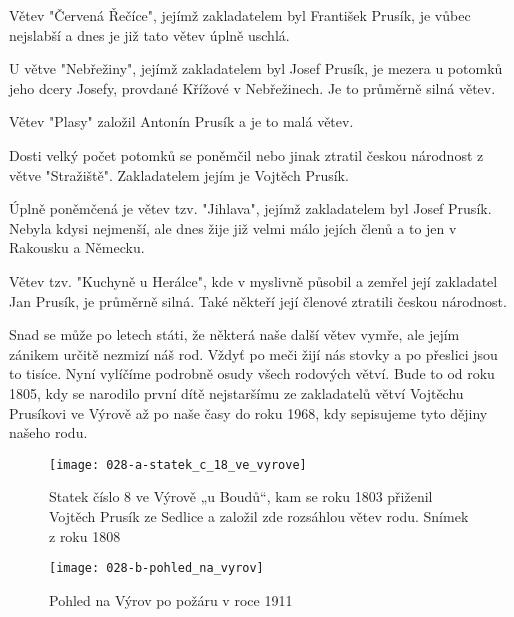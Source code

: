 \documentclass[../dejiny-rodu-prusiku.tex]{subfiles}
\begin{document}
Větev "Červená Řečíce", jejímž zakladatelem byl František Prusík, je vůbec nejslabší a dnes je již tato větev úplně uschlá.

U větve "Nebřežiny", jejímž zakladatelem byl Josef Prusík, je mezera u potomků jeho dcery Josefy, provdané Křížové v Nebřežinech. Je to průměrně silná větev.

Větev "Plasy" založil Antonín Prusík a je to malá větev.

Dosti velký počet potomků se poněmčil nebo jinak ztratil českou národnost z větve "Stražiště". Zakladatelem jejím je Vojtěch Prusík.

Úplně poněmčená je větev tzv. "Jihlava", jejímž zakladatelem byl Josef Prusík. Nebyla kdysi nejmenší, ale dnes žije již velmi málo jejích členů a to jen v Rakousku a Německu.

Větev tzv. "Kuchyně u Herálce", kde v myslivně působil a zemřel její zakladatel Jan Prusík, je průměrně silná. Také někteří její členové ztratili českou národ­nost.

Snad se může po letech státi, že některá naše další větev vymře, ale jejím zánikem určitě nezmizí náš rod. Vždyť po meči žijí nás stovky a po přeslici jsou to tisíce. Nyní vylíčíme podrobně osudy všech rodových větví. Bude to od roku 1805, kdy se narodilo první dítě nejstaršímu ze zakladatelů větví Vojtěchu Prusíkovi ve Výrově až po naše časy do roku 1968, kdy sepisujeme tyto dějiny našeho rodu.


\begin{figure}
\centering
\texttt{[image: 028-a-statek\_c\_18\_ve\_vyrove]}
\caption{Statek číslo 8 ve Výrově „u Boudů“, kam se roku 1803 přiženil Vojtěch Prusík ze Sedlice a založil zde rozsáhlou větev rodu. Snímek z roku 1808}
\label{fig:028-a-statek_c_18_ve_vyrove}
\end{figure}

\begin{figure}
\centering
\texttt{[image: 028-b-pohled\_na\_vyrov]}
\caption{Pohled na Výrov po požáru v roce 1911}
\label{fig:028-b-pohled_na_vyrov}
\end{figure}
\end{document}
